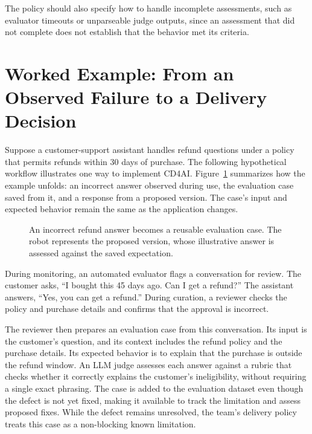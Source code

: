The policy should also specify how
to handle incomplete assessments, such as evaluator timeouts or unparseable
judge outputs, since an assessment that did not complete does not establish
that the behavior met its criteria.

\section{Worked Example: From an Observed Failure to a Delivery Decision}
\label{sec:cd4ai-worked-example}
\label{sec:cd4ai-dynamics}

Suppose a customer-support assistant handles refund questions under a policy
that permits refunds within 30 days of purchase. The following hypothetical
workflow illustrates one way to implement CD4AI.
Figure~\ref{fig:cd4ai-case-lifecycle} summarizes how the example unfolds: an
incorrect answer observed during use, the evaluation case saved from it, and a
response from a proposed version. The case's input and expected behavior
remain the same as the application changes.

\begin{figure}[htbp]
  \centering
  
  \caption{An incorrect refund answer becomes a reusable evaluation case.
    The robot represents the proposed version, whose illustrative answer is
    assessed against the saved expectation.}
  \label{fig:cd4ai-case-lifecycle}
\end{figure}

During monitoring, an automated evaluator flags a conversation for review. The
customer asks, \enquote{I bought this 45 days ago. Can I get a refund?} The
assistant answers, \enquote{Yes, you can get a refund.} During curation, a
reviewer checks the policy and purchase details and confirms that the approval
is incorrect.

The reviewer then prepares an evaluation case from this conversation. Its input
is the customer's question, and its context includes the refund policy and the
purchase details. Its expected behavior is to explain that the purchase is
outside the refund window. An LLM judge assesses each answer against a rubric
that checks whether it correctly explains the customer's ineligibility, without
requiring a single exact phrasing. The case is added to the evaluation dataset
even though the defect is not yet fixed, making it available to track the
limitation and assess proposed fixes. While the defect remains unresolved, the
team's delivery policy treats this case as a non-blocking known limitation.

